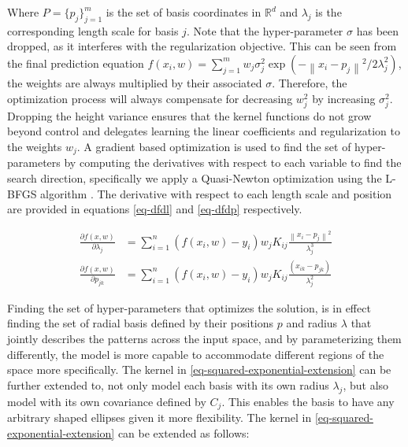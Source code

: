 \documentclass[useAMS,usenatbib,fleqn]{mn2e}
\begin{document}
Where $P=\{p_{j}\}_{j=1}^{m}$ is the set of basis coordinates in $\mathbb{R}^{d}$ and $\lambda_{j}$ is the corresponding length scale for basis $j$. Note that the hyper-parameter $\sigma$ has been dropped, as it interferes with the regularization objective. This can be seen from the final prediction equation $f(x_{i},w)=\sum_{j=1}^{m}w_{j}\sigma_{j}^{2}\exp{\left(-\left\| x_{i}-p_{j}\right\|^{2}/2\lambda_{j}^{2}\right)}$, the weights are always multiplied by their associated $\sigma$. Therefore, the optimization process will always compensate for decreasing $w_{j}^{2}$ by increasing $\sigma_{j}^{2}$. Dropping the height variance ensures that the kernel functions do not grow beyond control and delegates learning the linear coefficients and regularization to the weights $w_{j}$. A gradient based optimization is used to find the set of hyper-parameters by computing the derivatives with respect to each variable to find the search direction, specifically we apply a Quasi-Newton optimization using the L-BFGS algorithm \cite{}. The derivative with respect to each length scale and position are provided in equations \eqref{eq-dfdl} and \eqref{eq-dfdp} respectively. 

\begin{subequations}
\begin{align} 
\label{eq-dfdl}
\frac{\partial f(x,w)}{\partial \lambda_{j}} &= \sum_{i=1}^{n}\left(f(x_{i},w)-y_{i}\right)w_{j}K_{ij}\frac{\left\| x_{i}-p_{j}\right\|^{2}}{\lambda_{j}^{3}}\\
\label{eq-dfdp}
\frac{\partial f(x,w)}{\partial p_{jk}} &= \sum_{i=1}^{n}\left(f(x_{i},w)-y_{i}\right)w_{j}K_{ij}\frac{(x_{ik}-p_{jk})}{\lambda_{j}^{2}}
\end{align}
\end{subequations}

Finding the set of hyper-parameters that optimizes the solution, is in effect finding the set of radial basis defined by their positions $p$ and radius $\lambda$ that jointly describes the patterns across the input space, and by parameterizing them differently, the model is more capable to accommodate different regions of the space more specifically. The kernel in \eqref{eq-squared-exponential-extension} can be further extended to, not only model each basis with its own radius $\lambda_{j}$, but also model with its own covariance defined by $C_{j}$. This enables the basis to have any arbitrary shaped ellipses given it more flexibility. The kernel in \eqref{eq-squared-exponential-extension} can be extended as follows:
\end{document}
